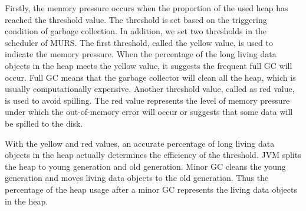 Firstly, the memory pressure occurs when the proportion of the used heap has reached the threshold value. The threshold is set based on the triggering condition of garbage collection. In addition, we set two thresholds in the scheduler of MURS. The first threshold, called the yellow value, is used to indicate the memory pressure. When the percentage of the long living data objects in the heap meets the yellow value, it suggests the frequent full GC will occur. Full GC means that the garbage collector will clean all the heap, which is usually computationally expensive. Another threshold value, called as red value, is used to avoid spilling. The red value represents the level of memory pressure under which the out-of-memory error will occur or suggests that some data will be spilled to the disk. 

With the yellow and red values, an accurate percentage of long living data objects in the heap actually determines the efficiency of the threshold. JVM splits the heap to young generation and old generation. Minor GC cleans the young generation and moves living data objects to the old generation. Thus the percentage of the heap usage after a minor GC represents the living data objects in the heap. 



